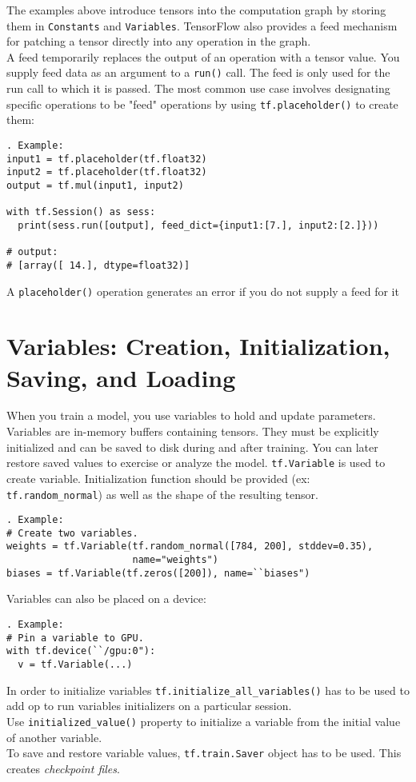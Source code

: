 \documentclass[11pt,a4paper]{article}
\begin{document}
The examples above introduce tensors into the computation graph by storing them in \texttt{Constants} and \texttt{Variables}. TensorFlow also provides a feed mechanism for patching a tensor directly into any operation in the graph.\\
A feed temporarily replaces the output of an operation with a tensor value. You supply feed data as an argument to a \texttt{run()} call. The feed is only used for the run call to which it is passed. The most common use case involves designating specific operations to be "feed" operations by using \texttt{tf.placeholder()} to create them:
\begin{lstlisting}. Example: 
input1 = tf.placeholder(tf.float32)
input2 = tf.placeholder(tf.float32)
output = tf.mul(input1, input2)

with tf.Session() as sess:
  print(sess.run([output], feed_dict={input1:[7.], input2:[2.]}))

# output:
# [array([ 14.], dtype=float32)]
\end{lstlisting}
A \texttt{placeholder()} operation generates an error if you do not supply a feed for it
\section{Variables: Creation, Initialization, Saving, and Loading}

When you train a model, you use variables to hold and update parameters. Variables are in-memory buffers containing tensors. They must be explicitly initialized and can be saved to disk during and after training. You can later restore saved values to exercise or analyze the model.
\texttt{tf.Variable} is used to create variable. Initialization function should be provided (ex: \texttt{tf.random\_normal}) as well as the shape of the resulting tensor. 
\begin{lstlisting}. Example: 
# Create two variables.
weights = tf.Variable(tf.random_normal([784, 200], stddev=0.35),
                      name="weights")
biases = tf.Variable(tf.zeros([200]), name=``biases")
\end{lstlisting}
Variables can also be placed on a device: 
\begin{lstlisting}. Example: 
# Pin a variable to GPU.
with tf.device(``/gpu:0"):
  v = tf.Variable(...)
\end{lstlisting} 
In order to initialize variables \texttt{tf.initialize\_all\_variables()} has to be used to add op to run variables initializers on a particular session. \\
Use \texttt{initialized\_value()} property to initialize a variable from the initial value of another variable. \\
To save and restore variable values, \texttt{tf.train.Saver} object has to be used. This creates \textit{checkpoint files}. 
\end{document}
